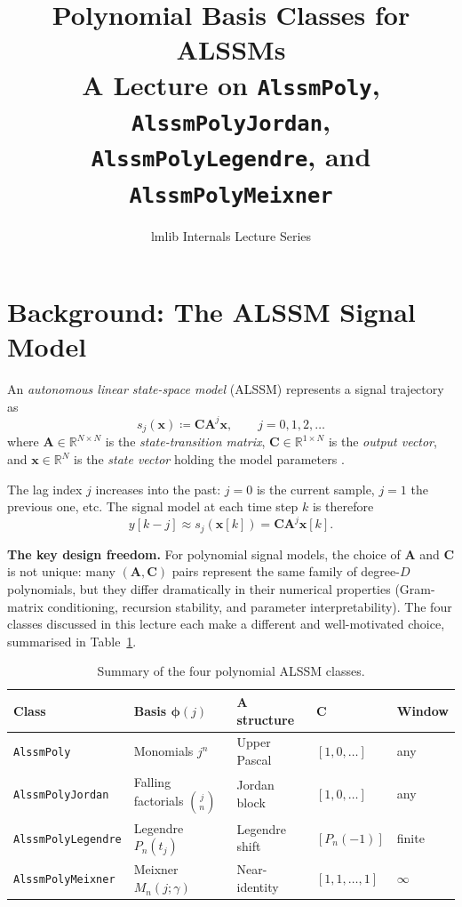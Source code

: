 \documentclass[11pt, a4paper]{article}
\title{\textbf{Polynomial Basis Classes for ALSSMs}\\[0.5em]
\large A Lecture on \texttt{AlssmPoly}, \texttt{AlssmPolyJordan},\\
\texttt{AlssmPolyLegendre}, and \texttt{AlssmPolyMeixner}}
\author{lmlib Internals Lecture Series}
\date{}
\theoremstyle{definition}
\newcommand{\R}{\mathbb{R}}
\newcommand{\vx}{\bm{x}}
\newcommand{\vC}{\bm{C}}
\newcommand{\mA}{\bm{A}}
\newcommand{\mphi}{\bm{\phi}}
\newcommand{\defeq}{\coloneqq}
\begin{document}
\maketitle
\tableofcontents
\bigskip

\section{Background: The ALSSM Signal Model}

An \emph{autonomous linear state-space model} (ALSSM) represents a signal
trajectory as
\begin{equation}
  s_j(\vx) \defeq \vC \mA^j \vx, \qquad j = 0, 1, 2, \ldots
  \label{eq:alssm}
\end{equation}
where $\mA \in \R^{N \times N}$ is the \emph{state-transition matrix},
$\vC \in \R^{1 \times N}$ is the \emph{output vector}, and
$\vx \in \R^N$ is the \emph{state vector} holding the model parameters
\cite{Wildhaber2019, Zalmai2017}.

The lag index $j$ increases into the past: $j=0$ is the current sample,
$j=1$ the previous one, etc.  The signal model at each time step $k$ is
therefore
\[
  y[k-j] \approx s_j(\vx[k]) = \vC \mA^j \vx[k].
\]

\medskip
\noindent\textbf{The key design freedom.}
For polynomial signal models, the choice of $\mA$ and $\vC$ is not unique:
many $(\mA, \vC)$ pairs represent the same family of degree-$D$ polynomials,
but they differ dramatically in their numerical properties (Gram-matrix
conditioning, recursion stability, and parameter interpretability).  The four
classes discussed in this lecture each make a different and well-motivated
choice, summarised in Table~\ref{tab:summary}.

\begin{table}[h]
\centering
\caption{Summary of the four polynomial ALSSM classes.}
\label{tab:summary}
\renewcommand{\arraystretch}{1.3}
\begin{tabular}{lllll}
\toprule
Class & Basis $\mphi(j)$ & $\mA$ structure & $\vC$ & Window \\
\midrule
\texttt{AlssmPoly}         & Monomials $j^n$             & Upper Pascal        & $[1,0,\ldots]$                   & any \\
\texttt{AlssmPolyJordan}   & Falling factorials $\binom{j}{n}$ & Jordan block   & $[1,0,\ldots]$                   & any \\
\texttt{AlssmPolyLegendre} & Legendre $P_n(t_j)$         & Legendre shift      & $[P_n(-1)]$                      & finite \\
\texttt{AlssmPolyMeixner}  & Meixner $M_n(j;\gamma)$     & Near-identity       & $[1,1,\ldots,1]$                 & $\infty$ \\
\bottomrule
\end{tabular}
\end{table}
\end{document}
